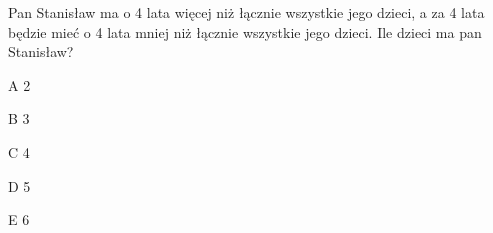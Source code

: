 \begin{tresc}
Pan Stanisław ma o 4 lata więcej niż łącznie wszystkie jego dzieci, a za 4 lata będzie mieć o 4 lata mniej niż łącznie wszystkie jego dzieci. Ile dzieci ma pan Stanisław?
\end{tresc}
\begin{wariant}{A} 2 \end{wariant}
\begin{wariant}{B} 3 \end{wariant}
\begin{wariant}{C} 4 \end{wariant}
\begin{wariant}{D} 5 \end{wariant}
\begin{wariant}{E} 6 \end{wariant}

